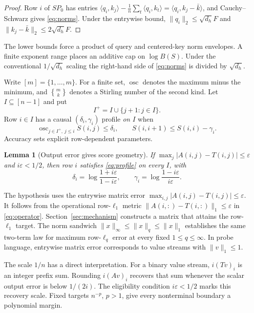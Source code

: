 \documentclass[10pt]{article}
\newtheorem{lemma}[theorem]{Lemma}
\theoremstyle{definition}
\DeclareMathOperator{\osc}{osc}
\newcommand{\Stirling}[2]{\genfrac{\{}{\}}{0pt}{}{#1}{#2}}
\begin{document}
\begin{proof}
Row \(i\) of \(SP_0\) has entries
\(\langle q_i,k_j\rangle-\frac1n\sum_t\langle q_i,k_t\rangle
=\langle q_i,k_j-\bar k\rangle\), and Cauchy--Schwarz gives
\eqref{eq:norms}.  Under the entrywise bound,
\(\|q_i\|_2\le\sqrt{d_h}F\) and
\(\|k_j-\bar k\|_2\le2\sqrt{d_h}F\).
\end{proof}

The lower bounds force a product of query and centered-key norm
envelopes.  A finite exponent range places an additive cap on \(\log B(S)\).
Under the conventional
\(1/\sqrt{d_h}\) scaling the right-hand side of \eqref{eq:norms} is divided by
\(\sqrt{d_h}\).

Write \([m]=\{1,\ldots,m\}\).  For a finite set, \(\osc\) denotes the maximum
minus the minimum, and \(\Stirling{m}{k}\) denotes a Stirling number of the
second kind.  Let
\(I\subseteq[n-1]\) and put
\[
 I^+=I\cup\{j+1:j\in I\}.
\]
Row \(i\in I\) has a causal \((\delta_i,\gamma_i)\) profile
\emph{on \(I\)} when
\begin{equation}\label{eq:profile}
 \osc_{j\in I^+,\ j\le i}S(i,j)\le\delta_i,
 \qquad S(i,i+1)\le S(i,i)-\gamma_i.
\end{equation}
Accuracy sets explicit row-dependent parameters.

\begin{lemma}[Output error gives score geometry]\label{lem:profile}
If \(\max_j|A(i,j)-T(i,j)|\le\varepsilon\) and \(i\varepsilon<1/2\), then
row \(i\) satisfies \eqref{eq:profile} on every \(I\), with
\begin{equation}\label{eq:rowprofile}
 \delta_i=\log\frac{1+i\varepsilon}{1-i\varepsilon},
 \qquad
 \gamma_i=\log\frac{1-i\varepsilon}{i\varepsilon}.
\end{equation}
\end{lemma}

The hypothesis uses the entrywise matrix error
\(\max_{i,j}|A(i,j)-T(i,j)|\le\varepsilon\).  It follows from the operational
row-\(\ell_1\) metric \(\|A(i,:)-T(i,:)\|_1\le\varepsilon\) in
\eqref{eq:operator}.  Section~\ref{sec:mechanism} constructs a matrix that
attains the row-\(\ell_1\) target.  The norm sandwich
\(\|x\|_\infty\le\|x\|_q\le\|x\|_1\) establishes the same two-term law for
maximum row-\(\ell_q\) error at every fixed \(1\le q\le\infty\).  In probe
language, entrywise matrix error corresponds to value streams with
\(\|v\|_1\le1\).

The scale \(1/n\) has a direct interpretation.  For a binary value stream,
\(i(Tv)_i\) is an integer prefix sum.  Rounding \(i(Av)_i\) recovers that sum
whenever the scalar output error is below \(1/(2i)\).  The eligibility
condition \(i\varepsilon<1/2\) marks this recovery scale.  Fixed targets
\(n^{-p}\), \(p>1\), give every nonterminal boundary a polynomial margin.
\end{document}
